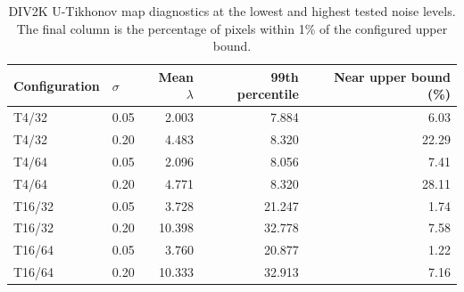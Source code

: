 \begin{table}[htbp]
\centering
\caption{DIV2K U-Tikhonov map diagnostics at the lowest and highest tested noise levels. The final column is the percentage of pixels within 1\% of the configured upper bound.}
\label{tab:u_tikhonov_map_diagnostics}
\begin{tabular}{llrrr}
\toprule
Configuration & $\sigma$ & Mean $\lambda$ & 99th percentile & Near upper bound (\%) \\
\midrule
T4/32 & 0.05 & 2.003 & 7.884 & 6.03 \\
T4/32 & 0.20 & 4.483 & 8.320 & 22.29 \\
T4/64 & 0.05 & 2.096 & 8.056 & 7.41 \\
T4/64 & 0.20 & 4.771 & 8.320 & 28.11 \\
T16/32 & 0.05 & 3.728 & 21.247 & 1.74 \\
T16/32 & 0.20 & 10.398 & 32.778 & 7.58 \\
T16/64 & 0.05 & 3.760 & 20.877 & 1.22 \\
T16/64 & 0.20 & 10.333 & 32.913 & 7.16 \\
\bottomrule
\end{tabular}
\end{table}

